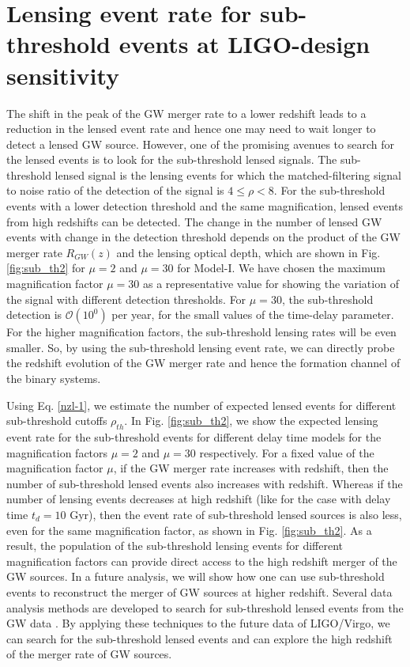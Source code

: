 \documentclass[a4paper,useAMS,usenatbib]{mnras}
\begin{document}
\section{Lensing event rate for sub-threshold events at LIGO-design sensitivity }\label{lensingrate_sub}

The shift in the peak of the GW merger rate to a lower redshift leads to a reduction in the lensed event rate and hence one may need to wait longer to detect a lensed GW source. However, one of the promising avenues to search for the lensed events is to look for the sub-threshold lensed signals. The sub-threshold lensed signal is the lensing events for which the matched-filtering signal to noise ratio of the detection of the signal is $4\leq\rho<8$. For the sub-threshold events with a lower detection threshold and the same magnification, lensed events from high redshifts can be detected.  {The change in the number of lensed GW events with change in the detection threshold depends on the product of the GW merger rate $ R_{GW}(z)$ and the lensing optical depth, which are shown in Fig. \ref{fig:sub_th2} for $\mu=2$ and $\mu=30$ for Model-I. We have chosen the maximum magnification factor $\mu=30$ as a representative value for showing the variation of the signal with different detection thresholds. For $\mu=30$, the sub-threshold detection is $\mathcal{O}(10^0)$ per year, for the small values of the time-delay parameter. For the higher magnification factors, the sub-threshold lensing rates will be even smaller.} So, by using the sub-threshold lensing event rate, we can directly probe the redshift evolution of the  GW merger rate and hence the formation channel of the binary systems. 

Using Eq. \eqref{nzl-1}, we estimate the number of expected lensed events for different sub-threshold cutoffs $\rho_{th}$.  In Fig. \ref{fig:sub_th2}, we show the expected lensing event rate for the sub-threshold events for different delay time models for the magnification factors $\mu=2$ and $\mu=30$ respectively. For a fixed value of the magnification factor $\mu$, if the GW  merger rate increases with redshift, then the number of sub-threshold lensed events also increases with redshift. Whereas if the number of lensing events decreases at high redshift (like for the case with delay time $t_d= 10$ Gyr), then the event rate of sub-threshold lensed sources is also less, even for the same magnification factor, as shown in Fig. \ref{fig:sub_th2}. As a result, the population of the sub-threshold lensing events for different magnification factors can provide direct access to the high redshift merger of the GW sources. In a future analysis, we will show how one can use sub-threshold events to reconstruct the merger of GW sources at higher redshift. {Several data analysis methods are developed to search for sub-threshold lensed events from the GW data \citep{Li:2019osa, McIsaac:2019use}. By applying these techniques to the future data of LIGO/Virgo, we can search for the sub-threshold lensed events and can explore the high redshift of the merger rate of GW sources.}  
\end{document}
